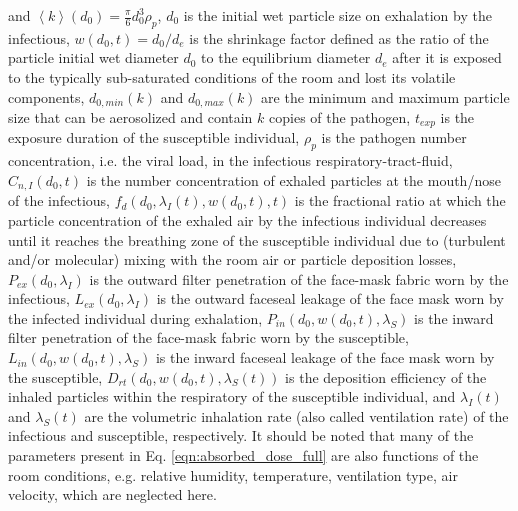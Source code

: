 \documentclass[preprint]{elsarticle}
\newcommand{\expectedk}[1]{\ensuremath{\left<k\right>\!\left(#1\right)}}
\begin{document}
\noindent and $\expectedk{d_0} = \frac{\pi}{6} d_0^3 \rho_{p}$, $d_0$ is the initial wet particle size on exhalation by the infectious, $w(d_0, t) = d_0/d_e$ is the shrinkage factor defined as the ratio of the particle initial wet diameter $d_0$ to the equilibrium diameter $d_e$ after it is exposed to the typically sub-saturated conditions of the room and lost its volatile components, $d_{0, min}(k)$ and $d_{0, max}(k)$ are the minimum and maximum particle size that can be aerosolized and contain $k$ copies of the pathogen, $t_{exp}$ is the exposure duration of the susceptible individual, $\rho_{p}$ is the pathogen number concentration, i.e. the viral load, in the infectious respiratory-tract-fluid, $C_{n,I}(d_0, t)$ is the number concentration of exhaled particles at the mouth/nose of the infectious, $f_d(d_0, \lambda_{I}(t), w(d_0, t), t)$ is the fractional ratio at which the particle concentration of the exhaled air by the infectious individual decreases until it reaches the breathing zone of the susceptible individual due to (turbulent and/or molecular) mixing with the room air or particle deposition losses, $P_{ex}(d_0, \lambda_I)$ is the outward filter penetration of the face-mask fabric worn by the infectious, $L_{ex}(d_0, \lambda_I)$ is the outward faceseal leakage of the face mask worn by the infected individual during exhalation, $P_{in}(d_0, w(d_0, t), \lambda_S)$ is the inward filter penetration of the face-mask fabric worn by the susceptible, $L_{in}(d_0, w(d_0, t), \lambda_S)$ is the inward faceseal leakage of the face mask worn by the susceptible, $D_{rt}(d_0, w(d_0, t), \lambda_{S}(t))$ is the deposition efficiency of the inhaled particles within the respiratory of the susceptible individual, and $\lambda_{I}(t)$ and $\lambda_{S}(t)$ are the volumetric inhalation rate (also called ventilation rate) of the infectious and susceptible, respectively. It should be noted that many of the parameters present in Eq. \ref{eqn:absorbed_dose_full} are also functions of the room conditions, e.g. relative humidity, temperature, ventilation type, air velocity, which are neglected here.
\end{document}
